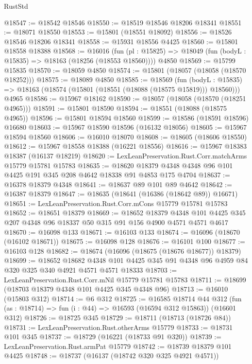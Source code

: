 \begin{lexlean}{RustStd}
\begin{coremodule}
@18547 := @18542 @18546
@18550 := @18519 @18546 @18206 @18341
@18551 := @18071 @18550
@18553 := @15801 (@18551 @18092)
@18556 := @18526 @18546 @18206 @18341
@18558 := @15931 @18556 @4425
@18560 := @15801 @18558 @18388
@18568 := @16016
    (fun (pl : @15825) => @18049 (fun (bodyL : @15835) => @18163 (@18256 (@18553 @18560))))
    @4850
@18569 := @15799 @15835
@18570 := @18059 @4850
@18574 := @15801 (@18057 (@18058 (@18570 @18252)))
@18575 := @18089 @4850
@18585 := @18569
    (fun (bodyL : @15835) => @18163 (@18574 (@15801 (@18551 (@18088 (@18575 @15819))) @18560)))
    @4965
@18586 := @15967 @18162
@18590 := @18057 (@18058 (@18570 (@18251 @4965)))
@18591 := @15801 @18590
@18594 := @18551 (@18088 (@18575 @4965))
@18596 := @15801 @18594 @18560
@18599 := @18586 (@18591 @18596) @16680
@18603 := @15967 @18590 @18596 (@16132 @18056)
@18605 := @15967 @18594 @18560
@18606 := @16010 @18070
@18608 := @18605 (@18606 @18550)
@18612 := @15967 @18558 @18388 (@16221 @18556)
@18616 := @15967 @18383 @18387 (@16137 @18219)
@18620 := LexLeanPreservation.Rust.Corr.matchArms @15779 @15781 @15783
@18635 := @18620 @18379 @4348 @4348 @96 @101 @4425 @191 @345 @208 @4642 @18338 @91 @4853 @175 @4704
@18637 := @16378 @18379 @4348
@18641 := @18637 @89 @101 @89 @4642
@18642 := @16387 @18379
@18647 := @18635 (@18641 (@16386 (@18642 @89)) @16671)
@18651 := LexLeanPreservation.Rust.Corr.mCons @15779 @15781 @15783
@18652 := @18651 @18379
@18669 := @18652
    @18379
    @4348
    @101
    @4425
    @345
    @207
    @4348
    @96
    @18337
    @50
    @315
    @91
    @156
    @4900
    @4571
    @4571
    @4617
@18670 := @16098 @133
@18671 := @16103 @133
@18674 := @16096 (@18670 (@16102 @18671))
@18675 := @16098 @128
@18676 := @16101 @100
@18677 := @16103 @128
@18682 := @18674 (@16096 (@18675 (@18676 @18677)) @18379)
@18699 := @18652
    @18682
    @4348
    @101
    @4425
    @345
    @91
    @4348
    @96
    @4959
    @84
    @320
    @325
    @340
    @4921
    @4571
    @4571
    @18333
@18703 := LexLeanPreservation.Rust.Corr.mNil @15779 @15781 @15783
@18711 := @18699 (@18703 @18379 @4348 @101 @4425 @345 @4348 @96)
@18713 := @16010 (@15803 @312)
@18714 := @6 @312
@18725 := @16585
    @18714
    @44
    @312
    (fun (as : @18714) => fun (i : @44) => @16593 (@16594 @312 @15863))
    (@16601 @312)
@18726 := @18725 @345
@18729 := @18711 (@18713 (@18726 @84))
@18731 := LexLeanPreservation.Rust.otherArms @15779
@18733 := @18731 @101 @345
@18737 := @18729 (@16221 (@18733 @91 @320))
@18739 := LexLeanPreservation.Rust.armPat @15779
@18742 := @18739 @18379 @101 @4425
@18748 := @18737 (@16137 (@18742 @320 @325 @4921 @4571))

\end{coremodule}
\end{lexlean}
